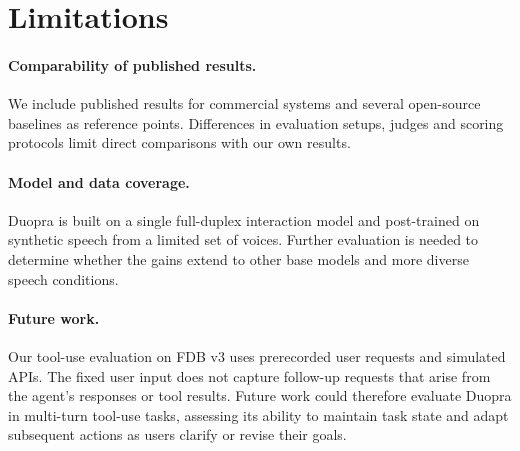 \section*{Limitations}

\paragraph{Comparability of published results.}
We include published results for commercial systems and several open-source baselines as reference points.
Differences in evaluation setups, judges and scoring protocols limit direct comparisons with our own results.

\paragraph{Model and data coverage.}
Duopra is built on a single full-duplex interaction model and post-trained on synthetic speech from a limited set of voices.
Further evaluation is needed to determine whether the gains extend to other base models and more diverse speech conditions.

\paragraph{Future work.}
Our tool-use evaluation on FDB v3 uses prerecorded user requests and simulated APIs.
The fixed user input does not capture follow-up requests that arise from the agent's responses or tool results.
Future work could therefore evaluate Duopra in multi-turn tool-use tasks, assessing its ability to maintain task state and adapt subsequent actions as users clarify or revise their goals.